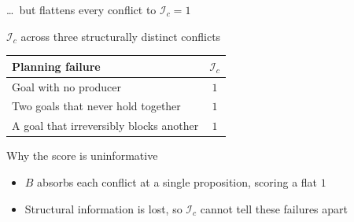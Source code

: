 \begin{frame}{\dots\ but flattens every conflict to $\mathcal{I}_c = 1$}
    \begin{exampleblock}{$\mathcal{I}_c$ across three structurally distinct conflicts}
        \centering
        \begin{tabular}{lc}
            \toprule
            Planning failure                        & $\mathcal{I}_c$ \\
            \midrule
            Goal with no producer                   & $1$             \\
            Two goals that never hold together      & $1$             \\
            A goal that irreversibly blocks another & $1$             \\
            \bottomrule
        \end{tabular}
    \end{exampleblock}

    \begin{block}{Why the score is uninformative}
        \begin{itemize}
            \item $B$ absorbs each conflict at a single proposition, scoring a flat $1$
            \item Structural information is lost, so $\mathcal{I}_c$ cannot tell these failures apart
        \end{itemize}
    \end{block}

\end{frame}
